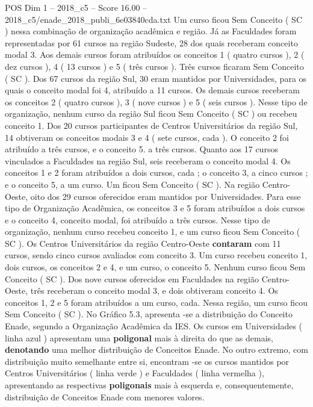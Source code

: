 \begin{textsample}{POS Dim 1 – 2018\_c5 – Score 16.00 – 2018\_c5/enade\_2018\_publi\_6e03840cda.txt}
Um curso ficou Sem Conceito ( SC ) nessa combinação de organização acadêmica e região.
Já as Faculdades foram representadas por 61 cursos na região Sudeste, 28 dos quais receberam conceito modal 3.
Aos demais cursos foram atribuídos os conceitos 1 ( quatro cursos ), 2 ( dez cursos ), 4 ( 13 cursos ) e 5 ( três cursos ).
Três cursos ficaram Sem Conceito ( SC ).
Dos 67 cursos da região Sul, 30 eram mantidos por Universidades, para os quais o conceito modal foi 4, atribuído a 11 cursos.
Os demais cursos receberam os conceitos 2 ( quatro cursos ), 3 ( nove cursos ) e 5 ( seis cursos ).
Nesse tipo de organização, nenhum curso da região Sul ficou Sem Conceito ( SC ) ou recebeu conceito 1.
Dos 20 cursos participantes de Centros Universitários da região Sul, 14 obtiveram os conceitos modais 3 e 4 ( sete cursos, cada ).
O conceito 2 foi atribuído a três cursos, e o conceito 5. a três cursos.
Quanto aos 17 cursos vinculados a Faculdades na região Sul, seis receberam o conceito modal 4.
Os conceitos 1 e 2 foram atribuídos a dois cursos, cada ; o conceito 3, a cinco cursos ; e o conceito 5, a um curso.
Um ficou Sem Conceito ( SC ).
Na região Centro-Oeste, oito dos 29 cursos oferecidos eram mantidos por Universidades.
Para esse tipo de Organização Acadêmica, os conceitos 3 e 5 foram atribuídos a dois cursos e o conceito 4, conceito modal, foi atribuído a três cursos.
Nesse tipo de organização, nenhum curso recebeu conceito 1, e um curso ficou Sem Conceito ( SC ).
Os Centros Universitários da região Centro-Oeste \textbf{contaram} com 11 cursos, sendo cinco cursos avaliados com conceito 3.
Um curso recebeu conceito 1, dois cursos, os conceitos 2 e 4, e um curso, o conceito 5.
Nenhum curso ficou Sem Conceito ( SC ).
Dos nove cursos oferecidos em Faculdades na região Centro-Oeste, três receberam o conceito modal 3, e dois obtiveram conceito 4.
Os conceitos 1, 2 e 5 foram atribuídos a um curso, cada.
Nessa região, um curso ficou Sem Conceito ( SC ).
No Gráfico 5.3, apresenta -se a distribuição do Conceito Enade, segundo a Organização Acadêmica da IES.
Os cursos em Universidades ( linha azul ) apresentam uma \textbf{poligonal} mais à direita do que as demais, \textbf{denotando} uma melhor distribuição de Conceitos Enade.
No outro extremo, com distribuição muito semelhante entre si, encontram -se os cursos mantidos por Centros Universitários ( linha verde ) e Faculdades ( linha vermelha ), apresentando as respectivas \textbf{poligonais} mais à esquerda e, consequentemente, distribuição de Conceitos Enade com menores valores.

\end{textsample}
